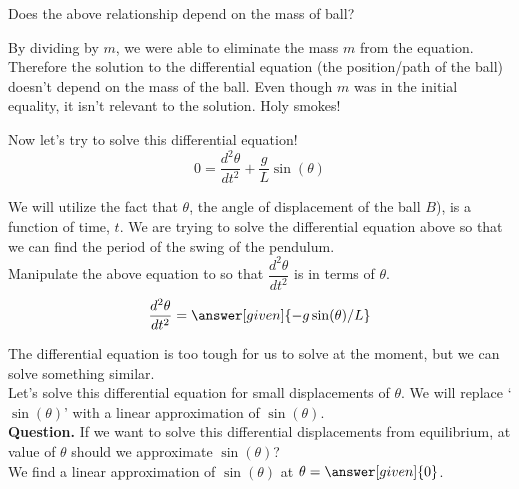 \documentclass[handout,nooutcomes]{ximera}
\begin{document}
\begin{problem}
Does the above relationship depend on the mass of ball?
\begin{multipleChoice}
\end{multipleChoice}
\begin{feedback}
By dividing by $m$, we were able to eliminate the mass $m$ from
the equation. Therefore the solution to the differential equation
(the position/path of the ball) doesn't depend
on the mass of the ball. Even though $m$ was in the initial equality,
it isn't relevant to the solution. Holy smokes!
\end{feedback}
\end{problem}

\begin{example}
\begin{explanation}
Now let's try to solve this differential equation!\\

\[
0 = \dfrac{d^2 \theta}{d t^2}  + \dfrac{g}{L} \sin(\theta)
\]

We will utilize the fact that $\theta$, the angle of displacement of the ball $B$),
is a function of time, $t$. We are trying to solve the differential
equation above so that we can find the period of the swing of the pendulum.\\

Manipulate the above equation to so that $\dfrac{d^2 \theta}{d t^2}$ is in terms of $\theta$.\\

\[
\dfrac{d^2 \theta}{d t^2}  = \answer[given]{-g\sin(\theta)/L}
\]

The differential equation is too tough for us to solve at the moment,
but we can solve something similar.\\


Let's solve this differential equation for small displacements
of $\theta$. We will replace `$\sin(\theta)$' with a linear approximation
of $\sin(\theta)$.\\



\textbf{Question. } If we want to solve this differential displacements from 
equilibrium, at value of $\theta$ should we approximate $\sin(\theta)$?\\


We find a linear approximation of $\sin(\theta)$ at $\theta = \answer[given]{0}$.\\




\end{explanation}
\end{example}
\end{document}
